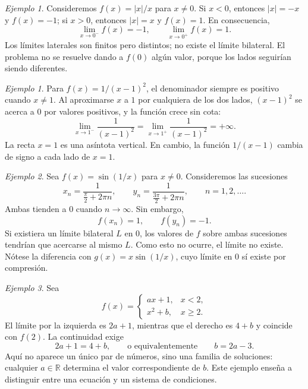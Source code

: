 \documentclass[12pt]{article}
\theoremstyle{remark}
\newtheorem{ejemplo}{Ejemplo}
\newtheorem{Ejem}{Ejemplo}
\newcommand{\R}{\mathbb{R}}
\begin{document}
\begin{Ejem}
Consideremos $f(x)=|x|/x$ para $x\ne0$. Si $x<0$, entonces $|x|=-x$ y $f(x)=-1$; si $x>0$, entonces $|x|=x$ y $f(x)=1$. En consecuencia,
\[
\lim_{x\to0^-}f(x)=-1,\qquad\lim_{x\to0^+}f(x)=1.
\]
Los límites laterales son finitos pero distintos; no existe el límite bilateral. El problema no se resuelve dando a $f(0)$ algún valor, porque los lados seguirían siendo diferentes.
\end{Ejem}


\begin{ejemplo}
Para $f(x)=1/(x-1)^2$, el denominador siempre es positivo cuando $x\ne1$. Al aproximarse $x$ a $1$ por cualquiera de los dos lados, $(x-1)^2$ se acerca a $0$ por valores positivos, y la función crece sin cota:
\[
\lim_{x\to1^-}\frac1{(x-1)^2}
=\lim_{x\to1^+}\frac1{(x-1)^2}=+\infty.
\]
La recta $x=1$ es una asíntota vertical. En cambio, la función $1/(x-1)$ cambia de signo a cada lado de $x=1$.
\end{ejemplo}

\begin{center}
\end{center}


\begin{ejemplo}
Sea $f(x)=\sin(1/x)$ para $x\ne0$. Consideremos las sucesiones
\[
x_n=\frac{1}{\frac\pi2+2\pi n},\qquad
y_n=\frac{1}{\frac{3\pi}2+2\pi n},\qquad n=1,2,\ldots.
\]
Ambas tienden a $0$ cuando $n\to\infty$. Sin embargo,
\[
f(x_n)=1,\qquad f(y_n)=-1.
\]
Si existiera un límite bilateral $L$ en $0$, los valores de $f$ sobre ambas sucesiones tendrían que acercarse al mismo $L$. Como esto no ocurre, el límite no existe. Nótese la diferencia con $g(x)=x\sin(1/x)$, cuyo límite en $0$ sí existe por compresión.
\end{ejemplo}


\begin{ejemplo}
Sea
\[
f(x)=\begin{cases}
ax+1,&x<2,\\
x^2+b,&x\ge2.
\end{cases}
\]
El límite por la izquierda es $2a+1$, mientras que el derecho es $4+b$ y coincide con $f(2)$. La continuidad exige
\[
2a+1=4+b,\qquad\text{o equivalentemente}\qquad\boxed{b=2a-3}.
\]
Aquí no aparece un único par de números, sino una familia de soluciones: cualquier $a\in\R$ determina el valor correspondiente de $b$. Este ejemplo enseña a distinguir entre una ecuación y un sistema de condiciones.
\end{ejemplo}
\end{document}
